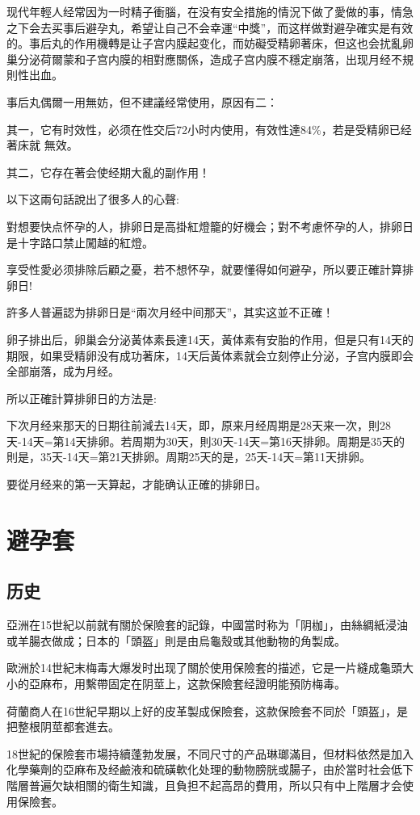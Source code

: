 \documentclass[12pt,UTF8]{ctexbook}
\begin{document}
现代年輕人经常因为一时精子衝腦，在没有安全措施的情況下做了愛做的事，情急之下会去买事后避孕丸，希望让自己不会幸運“中獎”，而这样做對避孕確实是有效的。事后丸的作用機轉是让子宫内膜起变化，而妨礙受精卵著床，但这也会扰亂卵巢分泌荷爾蒙和子宫内膜的相對應關係，造成子宫内膜不穩定崩落，出现月经不規則性出血。

事后丸偶爾一用無妨，但不建議经常使用，原因有二：

其一，它有时效性，必须在性交后72小时内使用，有效性達84\%，若是受精卵已经著床就
無效。

其二，它存在著会使经期大亂的副作用！

以下这兩句話說出了很多人的心聲:

對想要快点怀孕的人，排卵日是高掛紅燈籠的好機会；對不考慮怀孕的人，排卵日是十字路口禁止闖越的紅燈。

享受性愛必须排除后顧之憂，若不想怀孕，就要懂得如何避孕，所以要正確計算排卵日!

許多人普遍認为排卵日是“兩次月经中间那天”，其实这並不正確！

卵子排出后，卵巢会分泌黃体素長達14天，黃体素有安胎的作用，但是只有14天的期限，如果受精卵没有成功著床，14天后黃体素就会立刻停止分泌，子宫内膜即会全部崩落，成为月经。

所以正確計算排卵日的方法是:

下次月经来那天的日期往前減去14天，即，原来月经周期是28天来一次，則28天-14天=第14天排卵。若周期为30天，則30天-14天=第16天排卵。周期是35天的則是，35天-14天=第21天排卵。周期25天的是，25天-14天=第11天排卵。

要從月经来的第一天算起，才能确认正確的排卵日。

\section{避孕套}

\subsection{历史}

亞洲在15世紀以前就有關於保險套的記錄，中國當时称为「阴枷」，由絲綢紙浸油或羊腸衣做成；日本的「頭盔」則是由烏龜殼或其他動物的角製成。

歐洲於14世紀末梅毒大爆发时出现了關於使用保險套的描述，它是一片縫成龜頭大小的亞麻布，用繫帶固定在阴莖上，这款保險套经證明能預防梅毒。

荷蘭商人在16世紀早期以上好的皮革製成保險套，这款保險套不同於「頭盔」，是把整根阴莖都套進去。

18世紀的保險套市場持續蓬勃发展，不同尺寸的产品琳瑯滿目，但材料依然是加入化學藥劑的亞麻布及经鹼液和硫磺軟化处理的動物膀胱或腸子，由於當时社会低下階層普遍欠缺相關的衛生知識，且負担不起高昂的費用，所以只有中上階層才会使用保險套。
\end{document}
